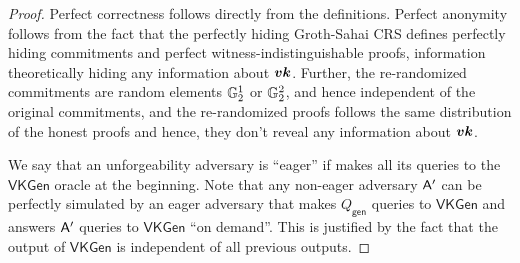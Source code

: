 \begin{proof}
Perfect correctness follows directly from the definitions. Perfect anonymity follows from the fact that the perfectly hiding Groth-Sahai CRS defines perfectly hiding commitments and perfect witness-indistinguishable proofs, information theoretically hiding any information about ${\boldsymbol{vk}}$. Further, the re-randomized commitments are random elements $\mathbb{G}_2^1$ or $\mathbb{G}_2^2$, and hence independent of the original commitments, and the re-randomized proofs follows the same distribution of the honest proofs and hence, they don't reveal any information about ${\boldsymbol{vk}}$.

We say that an unforgeability adversary is ``eager'' if  makes all its queries to the $\mathsf{VKGen}$ oracle at the beginning. Note that any non-eager adversary $\mathsf{A}'$ can be perfectly simulated  by an eager adversary that makes ${Q_\mathsf{gen}}$ queries to $\mathsf{VKGen}$ and answers $\mathsf{A}'$ queries to $\mathsf{VKGen}$ ``on demand''. This is justified by the fact that the output of $\mathsf{VKGen}$ is independent of all previous outputs.


\end{proof}
